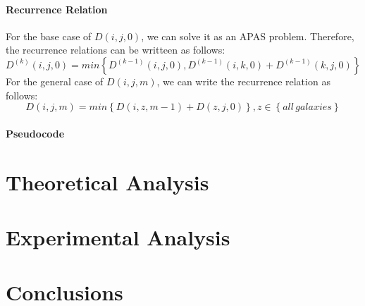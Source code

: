 \documentclass{article}
\begin{document}
\paragraph{Recurrence Relation}
For the base case of $D(i,j,0)$, we can solve it as an APAS problem. Therefore, the recurrence relations can be writteen as follows:
$$
D^{\left(k\right)}\left(i,j,0\right) = min\left\{D^{\left(k-1\right)}\left(i,j,0\right),D^{\left(k-1\right)}\left(i,k,0\right)+D^{\left(k-1\right)}\left(k,j,0\right)\right\}
$$
For the general case of $D(i,j,m)$, we can write the recurrence relation as follows:
$$
D\left(i,j,m\right) = min\left\{D\left(i,z,m-1\right)+D\left(z,j,0\right)\right\},z \in \left\{all\, galaxies\right\}
$$
\paragraph{Pseudocode}

\section{Theoretical Analysis}

\section{Experimental Analysis}

\section{Conclusions}
\end{document}
